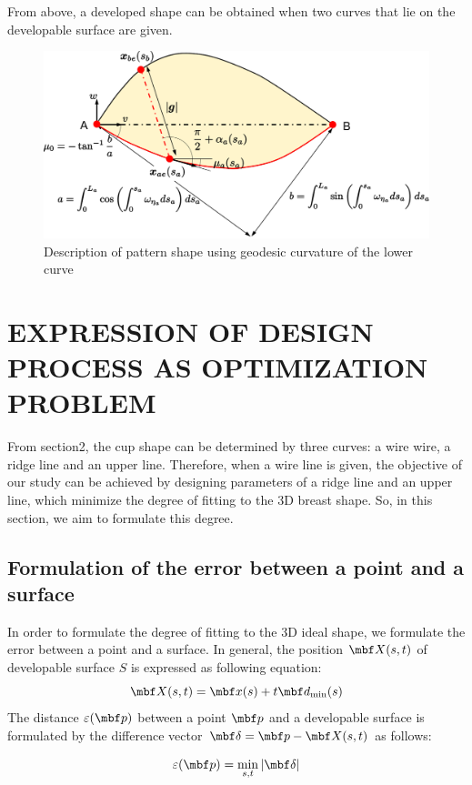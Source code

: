 \documentclass[E]{scitrans}
\begin{document}
From above, a developed shape can be obtained when two curves that lie on the developable surface are given.
\begin{figure}[thpb]
	\centering
	\includegraphics[width = \columnwidth]{./figure/PatternImage2.eps}
	\caption{Description of pattern shape using geodesic curvature of the lower curve}
	\label{fig:PatternImage}
\end{figure}
\section*{EXPRESSION OF DESIGN PROCESS AS OPTIMIZATION PROBLEM}
From section2, the cup shape can be determined by three curves: a wire wire, a ridge line and an upper line. Therefore, when a wire line is given, the objective of our study can be achieved by designing parameters of a ridge line and an upper line, which minimize the degree of fitting to the 3D breast shape. So, in this section, we aim to formulate this degree. 
\subsection*{Formulation of the error between a point and a surface}
In order to formulate the degree of fitting to the 3D ideal shape, we formulate the error between a point and a surface.
In general, the position $\mbold{X}(s,t)$ of developable surface $S$ is expressed as following equation:
\begin{equation}\label{eq:Sur_eq}
\mbold{X}(s,t) = \mbold{x}(s) + t\mbold{d}_{\min}(s)
\end{equation}
The distance $\varepsilon(\mbold{p})$ between a point $\mbold{p}$ and a developable surface is formulated by the difference vector $\mbold{\delta}=\mbold{p}-\mbold{X}(s,t)$ as follows:

\begin{equation}\label{eq:eps_eq}
\varepsilon(\mbold{p})=\min_{s,t}{|\mbold{\delta}|}
\end{equation}
\end{document}
